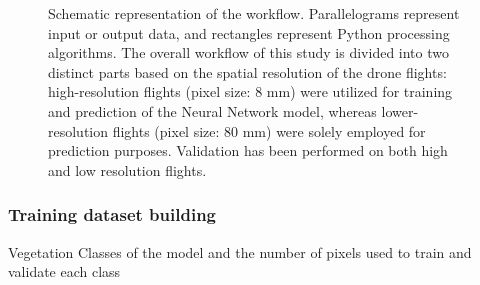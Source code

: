 \documentclass[
  number]{elsarticle}
\begin{document}
\label{cell-fig-workflow}
\begin{figure}[H]


\caption{\label{fig-workflow}Schematic representation of the workflow.
Parallelograms represent input or output data, and rectangles represent
Python processing algorithms. The overall workflow of this study is
divided into two distinct parts based on the spatial resolution of the
drone flights: high-resolution flights (pixel size: 8 mm) were utilized
for training and prediction of the Neural Network model, whereas
lower-resolution flights (pixel size: 80 mm) were solely employed for
prediction purposes. Validation has been performed on both high and low
resolution flights.}

\end{figure}%

\subsubsection{Training dataset
building}\label{training-dataset-building}

\begin{table}

\caption{\label{tbl-validationPX}Vegetation Classes of the model and the
number of pixels used to train and validate each class}


\end{table}%
\end{document}

